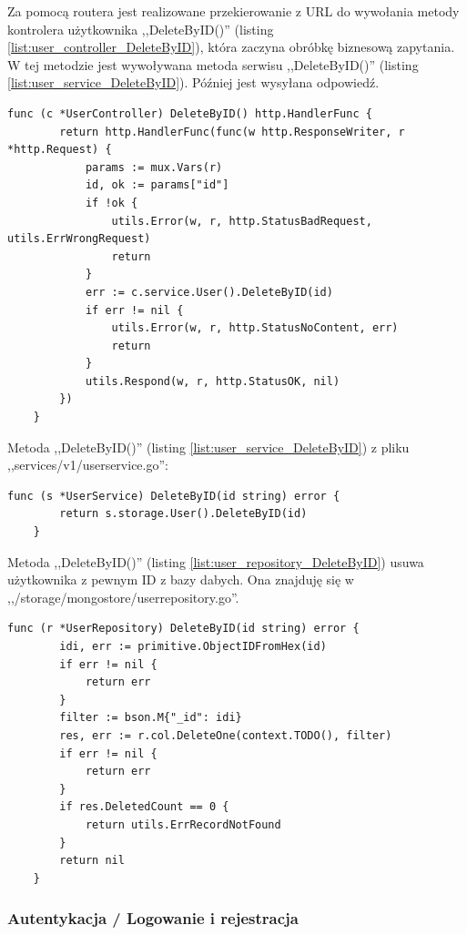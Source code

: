 Za pomocą routera jest realizowane przekierowanie z URL do wywołania metody kontrolera użytkownika ,,DeleteByID()'' (listing \ref{list:user_controller_DeleteByID}), która zaczyna obróbkę biznesową zapytania.
W tej metodzie jest wywoływana metoda serwisu ,,DeleteByID()'' (listing \ref{list:user_service_DeleteByID}). Później jest wysyłana odpowiedź.
\begin{lstlisting}[label=list:user_controller_DeleteByID,caption=Kontroler usunięcia użytkownika,basicstyle=\tiny\ttfamily]
    func (c *UserController) DeleteByID() http.HandlerFunc {
        return http.HandlerFunc(func(w http.ResponseWriter, r *http.Request) {
            params := mux.Vars(r)
            id, ok := params["id"]
            if !ok {
                utils.Error(w, r, http.StatusBadRequest, utils.ErrWrongRequest)
                return
            }
            err := c.service.User().DeleteByID(id)
            if err != nil {
                utils.Error(w, r, http.StatusNoContent, err)
                return
            }
            utils.Respond(w, r, http.StatusOK, nil)
        })
    }
\end{lstlisting}
Metoda ,,DeleteByID()'' (listing \ref{list:user_service_DeleteByID}) z pliku ,,services/v1/userservice.go'':
\begin{lstlisting}[label=list:user_service_DeleteByID,caption=Serwis usunięcia użytkownika,basicstyle=\tiny\ttfamily]
    func (s *UserService) DeleteByID(id string) error {
        return s.storage.User().DeleteByID(id)
    }
\end{lstlisting}
% 
Metoda ,,DeleteByID()'' (listing \ref{list:user_repository_DeleteByID}) usuwa użytkownika z pewnym ID z bazy dabych.
Ona znajduję się w ,,/storage/mongostore/userrepository.go''.
\begin{lstlisting}[label=list:user_repository_DeleteByID,caption=Usunięcie uzytkownika z bazy danych,basicstyle=\tiny\ttfamily]
    func (r *UserRepository) DeleteByID(id string) error {
        idi, err := primitive.ObjectIDFromHex(id)
        if err != nil {
            return err
        }
        filter := bson.M{"_id": idi}
        res, err := r.col.DeleteOne(context.TODO(), filter)
        if err != nil {
            return err
        }
        if res.DeletedCount == 0 {
            return utils.ErrRecordNotFound
        }
        return nil
    }
\end{lstlisting}

\subsubsection{Autentykacja / Logowanie i rejestracja}
\label{sec:autentykacja}

